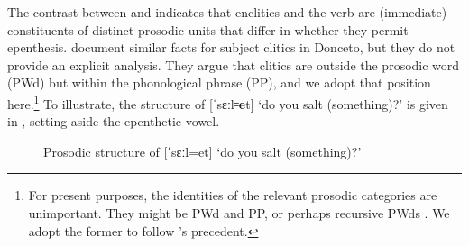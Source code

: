 \documentclass[output=paper,colorlinks,citecolor=brown]{langscibook}
\begin{document}
The contrast between  and  indicates that enclitics and the verb are (immediate) constituents of distinct prosodic units that differ in whether they permit epenthesis.  \citet{cardinalettirepetti:clitics} document similar facts for subject clitics in Donceto, but they do not provide an explicit analysis.  They argue that clitics are outside the prosodic word (PWd) but within the phonological phrase (PP), and we adopt that position here.\footnote{For present purposes, the identities of the relevant prosodic categories are unimportant.  They might be PWd and PP, or perhaps recursive PWds \citep{itomestercompounds}.  We adopt the former to follow \citeauthor{cardinalettirepetti:clitics}'s precedent.}  To illustrate, the structure of [ˈsɛːl꞊\textbf{e}t] `do you salt (something)?' is given in , setting aside the epenthetic vowel.

\begin{figure}
\caption{Prosodic structure of [ˈsɛːl=et] ‘do you salt (something)?’}
\label{doyousaltstructure}
\end{figure}
\end{document}
